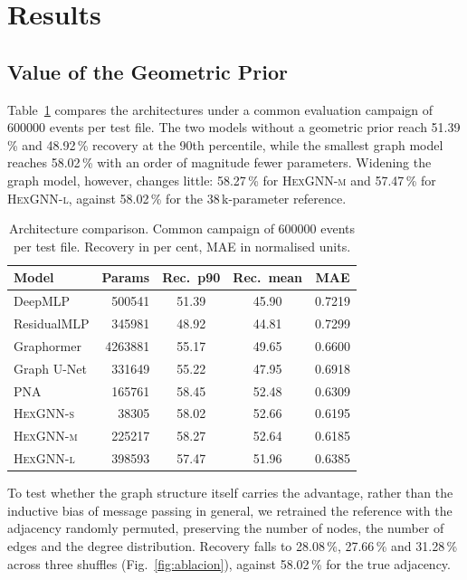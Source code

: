 \documentclass[10pt,conference]{IEEEtran}
\begin{document}
\section{Results}
\label{sec:results}

\subsection{Value of the Geometric Prior}

Table~\ref{tab:architectures} compares the architectures under a common
evaluation campaign of \num{600000} events per test file. The two models
without a geometric prior reach 51.39\,\% and 48.92\,\% recovery at the 90th
percentile, while the smallest graph model reaches 58.02\,\% with an order of
magnitude fewer parameters. Widening the graph model, however, changes little: 58.27\,\% for
\textsc{HexGNN-m} and 57.47\,\% for \textsc{HexGNN-l}, against 58.02\,\% for
the 38\,k-parameter reference.

\begin{table}[t]
\centering
\caption{Architecture comparison. Common campaign of \num{600000} events per
test file. Recovery in per cent, MAE in normalised units.}
\label{tab:architectures}
\begin{tabular}{@{}lrccc@{}}
\toprule
\textbf{Model} & \textbf{Params} & \textbf{Rec.\ p90} & \textbf{Rec.\ mean} & \textbf{MAE} \\
\midrule
DeepMLP          & \num{500541}  & 51.39 & 45.90 & 0.7219 \\
ResidualMLP      & \num{345981}  & 48.92 & 44.81 & 0.7299 \\
Graphormer       & \num{4263881} & 55.17 & 49.65 & 0.6600 \\
Graph U-Net      & \num{331649}  & 55.22 & 47.95 & 0.6918 \\
PNA              & \num{165761}  & 58.45 & 52.48 & 0.6309 \\
\textsc{HexGNN-s} & \num{38305}  & 58.02 & 52.66 & 0.6195 \\
\textsc{HexGNN-m} & \num{225217} & 58.27 & 52.64 & 0.6185 \\
\textsc{HexGNN-l} & \num{398593} & 57.47 & 51.96 & 0.6385 \\
\bottomrule
\end{tabular}
\end{table}

To test whether the graph structure itself carries the advantage, rather than
the inductive bias of message passing in general, we retrained the reference
with the adjacency randomly permuted, preserving the number of nodes, the
number of edges and the degree distribution. Recovery falls to 28.08\,\%,
27.66\,\% and 31.28\,\% across three shuffles (Fig.~\ref{fig:ablacion}),
against 58.02\,\% for the true adjacency.
\end{document}
